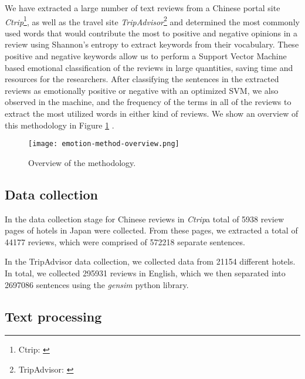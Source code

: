 We have extracted a large number of text reviews from a Chinese portal site \textit{Ctrip}\footnote{\label{ctrip}Ctrip: \href {www.ctrip.com/}{}}, as well as the travel site \textit{TripAdvisor}\footnote{\label{tripadvisor}TripAdvisor: \href {www.tripadvisor.com/}{}} and determined the most commonly used words that would contribute the most to positive and negative opinions in a review using Shannon's entropy to extract keywords from their vocabulary. These positive and negative keywords allow us to perform a Support Vector Machine \DIFaddbegin {}\DIFaddend based emotional classification of the reviews in large quantities, saving time and resources for the researchers. After classifying the sentences in the extracted reviews as emotionally positive or negative with an optimized SVM, we also observed \DIFdelbegin {}\DIFdelend \DIFaddbegin {}\DIFaddend in the machine, and the frequency of the terms in all of the reviews to extract the most utilized words in either kind of reviews. We show an overview of this methodology in Figure \ref{fig:method-overview} \cite[][]{Aleman2018ICAROB}.

\begin{figure}[bp]
\centering
\texttt{[image: emotion-method-overview.png]}
\caption{Overview of the methodology.}
\label{fig:method-overview}
\end{figure}

\subsection{Data collection}\label{datacollection}

In the data collection stage for Chinese reviews in \textit{Ctrip}\DIFaddbegin \DIFadd{, }\DIFaddend a total of \num[group-separator={,}]{5938} review pages of hotels in Japan were collected. From these pages, we extracted a total of \num[group-separator={,}]{44177} reviews, which were comprised of \num[group-separator={,}]{572218} separate sentences. 

In the TripAdvisor data collection, we collected data from \num[group-separator={,}]{21154} different hotels. In total, we collected \num[group-separator={,}]{295931} reviews in English, which we then separated into \num[group-separator={,}]{2697086} sentences using the \textit{gensim} python library. 

\subsection{Text processing}\label{textprocessing}

